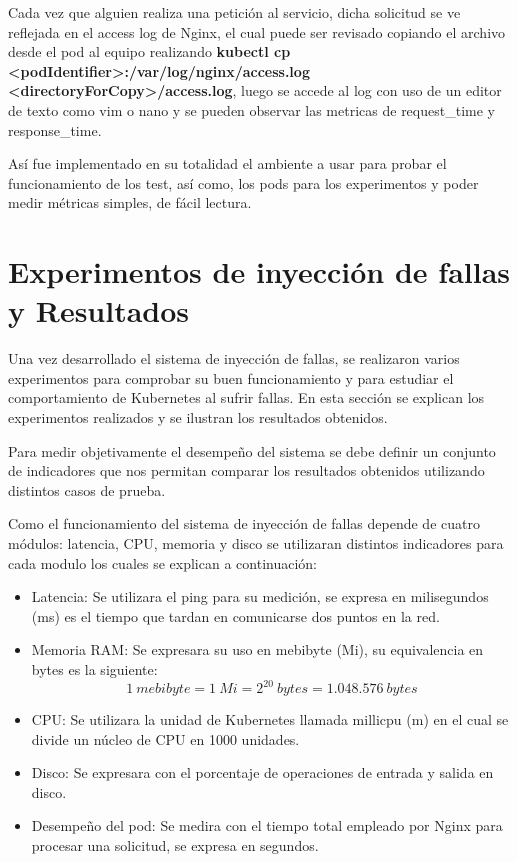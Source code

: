 \par Cada vez que alguien realiza una petición al servicio, dicha solicitud se ve reflejada en el access log de Nginx, el cual puede ser revisado copiando el archivo desde el pod al equipo realizando \textbf{kubectl cp <podIdentifier>:/var/log/nginx/access.log <directoryForCopy>/access.log}, luego se accede al log con uso de un editor de texto como vim o nano y se pueden observar las metricas de request\_time y response\_time.\\ 

\par Así fue implementado en su totalidad el ambiente a usar para probar el funcionamiento de los test, así como, los pods para los experimentos y poder medir métricas simples, de fácil lectura. 

\section{Experimentos de inyección de fallas y Resultados}

\par Una vez desarrollado el sistema de inyección de fallas, se realizaron varios experimentos para comprobar su buen funcionamiento y para estudiar el comportamiento de Kubernetes al sufrir fallas. En esta sección se explican los experimentos realizados y se ilustran los resultados obtenidos.\\


\par Para medir objetivamente el desempeño del sistema se debe definir un conjunto de indicadores que nos permitan comparar los resultados obtenidos utilizando distintos casos de prueba.\\


\par Como el funcionamiento del sistema de inyección de fallas depende de cuatro módulos: latencia, CPU, memoria y disco se utilizaran distintos indicadores para cada modulo los cuales se explican a continuación:
\begin{itemize}
    \item Latencia: Se utilizara el ping para su medición, se expresa en milisegundos (ms) es el tiempo que tardan en comunicarse dos puntos en la red.
    \item Memoria RAM: Se expresara su uso en mebibyte (Mi), su equivalencia en bytes es la siguiente: \[ 1\ mebibyte = 1\ Mi = 2^{20}\ bytes = 1.048.576\ bytes \]
    \item CPU: Se utilizara la unidad de Kubernetes llamada millicpu (m) en el cual se divide un núcleo de CPU en 1000 unidades.
    \item Disco: Se expresara con el porcentaje de operaciones de entrada y salida en disco.
    \item Desempeño del pod: Se medira con el tiempo total empleado por Nginx para procesar una solicitud, se expresa en segundos.
\end{itemize} 

